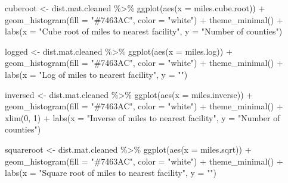 \documentclass[
  letterpaper,
  DIV=11,
  numbers=noendperiod]{scrreprt}
\newenvironment{Shaded}{\begin{snugshade}}{\end{snugshade}}
\newcommand{\AttributeTok}[1]{\textcolor[rgb]{0.40,0.45,0.13}{#1}}
\newcommand{\DecValTok}[1]{\textcolor[rgb]{0.68,0.00,0.00}{#1}}
\newcommand{\FunctionTok}[1]{\textcolor[rgb]{0.28,0.35,0.67}{#1}}
\newcommand{\NormalTok}[1]{\textcolor[rgb]{0.00,0.23,0.31}{#1}}
\newcommand{\OtherTok}[1]{\textcolor[rgb]{0.00,0.23,0.31}{#1}}
\newcommand{\SpecialCharTok}[1]{\textcolor[rgb]{0.37,0.37,0.37}{#1}}
\newcommand{\StringTok}[1]{\textcolor[rgb]{0.13,0.47,0.30}{#1}}
\begin{document}
\begin{Shaded}
\begin{Highlighting}[]
\NormalTok{cuberoot }\OtherTok{\textless{}{-}}\NormalTok{ dist.mat.cleaned }\SpecialCharTok{\%\textgreater{}\%}
    \FunctionTok{ggplot}\NormalTok{(}\FunctionTok{aes}\NormalTok{(}\AttributeTok{x =}\NormalTok{ miles.cube.root)) }\SpecialCharTok{+} \FunctionTok{geom\_histogram}\NormalTok{(}\AttributeTok{fill =} \StringTok{"\#7463AC"}\NormalTok{,}
    \AttributeTok{color =} \StringTok{"white"}\NormalTok{) }\SpecialCharTok{+} \FunctionTok{theme\_minimal}\NormalTok{() }\SpecialCharTok{+} \FunctionTok{labs}\NormalTok{(}\AttributeTok{x =} \StringTok{"Cube root of miles to nearest facility"}\NormalTok{,}
    \AttributeTok{y =} \StringTok{"Number of counties"}\NormalTok{)}

\NormalTok{logged }\OtherTok{\textless{}{-}}\NormalTok{ dist.mat.cleaned }\SpecialCharTok{\%\textgreater{}\%}
    \FunctionTok{ggplot}\NormalTok{(}\FunctionTok{aes}\NormalTok{(}\AttributeTok{x =}\NormalTok{ miles.log)) }\SpecialCharTok{+} \FunctionTok{geom\_histogram}\NormalTok{(}\AttributeTok{fill =} \StringTok{"\#7463AC"}\NormalTok{, }\AttributeTok{color =} \StringTok{"white"}\NormalTok{) }\SpecialCharTok{+}
    \FunctionTok{theme\_minimal}\NormalTok{() }\SpecialCharTok{+} \FunctionTok{labs}\NormalTok{(}\AttributeTok{x =} \StringTok{"Log of miles to nearest facility"}\NormalTok{, }\AttributeTok{y =} \StringTok{""}\NormalTok{)}

\NormalTok{inversed }\OtherTok{\textless{}{-}}\NormalTok{ dist.mat.cleaned }\SpecialCharTok{\%\textgreater{}\%}
    \FunctionTok{ggplot}\NormalTok{(}\FunctionTok{aes}\NormalTok{(}\AttributeTok{x =}\NormalTok{ miles.inverse)) }\SpecialCharTok{+} \FunctionTok{geom\_histogram}\NormalTok{(}\AttributeTok{fill =} \StringTok{"\#7463AC"}\NormalTok{, }\AttributeTok{color =} \StringTok{"white"}\NormalTok{) }\SpecialCharTok{+}
    \FunctionTok{theme\_minimal}\NormalTok{() }\SpecialCharTok{+} \FunctionTok{xlim}\NormalTok{(}\DecValTok{0}\NormalTok{, }\DecValTok{1}\NormalTok{) }\SpecialCharTok{+} \FunctionTok{labs}\NormalTok{(}\AttributeTok{x =} \StringTok{"Inverse of miles to nearest facility"}\NormalTok{,}
    \AttributeTok{y =} \StringTok{"Number of counties"}\NormalTok{)}

\NormalTok{squareroot }\OtherTok{\textless{}{-}}\NormalTok{ dist.mat.cleaned }\SpecialCharTok{\%\textgreater{}\%}
    \FunctionTok{ggplot}\NormalTok{(}\FunctionTok{aes}\NormalTok{(}\AttributeTok{x =}\NormalTok{ miles.sqrt)) }\SpecialCharTok{+} \FunctionTok{geom\_histogram}\NormalTok{(}\AttributeTok{fill =} \StringTok{"\#7463AC"}\NormalTok{, }\AttributeTok{color =} \StringTok{"white"}\NormalTok{) }\SpecialCharTok{+}
    \FunctionTok{theme\_minimal}\NormalTok{() }\SpecialCharTok{+} \FunctionTok{labs}\NormalTok{(}\AttributeTok{x =} \StringTok{"Square root of miles to nearest facility"}\NormalTok{,}
    \AttributeTok{y =} \StringTok{""}\NormalTok{)}
\end{Highlighting}
\end{Shaded}
\end{document}
